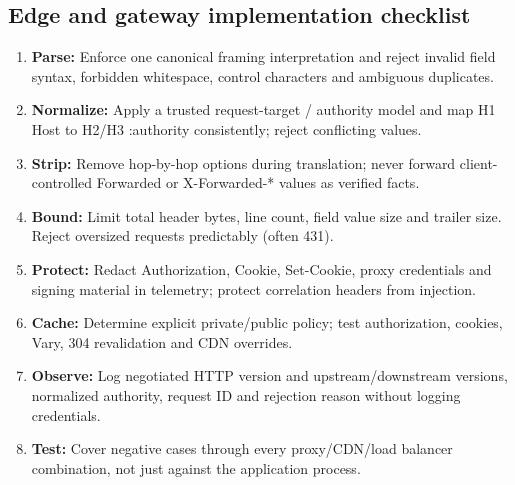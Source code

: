\documentclass[10pt,letterpaper,oneside]{article}
\newcommand{\field}[1]{{\ttfamily\small\color{Deep}#1}}
\begin{document}
\subsection{Edge and gateway implementation checklist}
\begin{enumerate}
\item \textbf{Parse:} Enforce one canonical framing interpretation and reject invalid field syntax, forbidden whitespace, control characters and ambiguous duplicates.
\item \textbf{Normalize:} Apply a trusted request-target / authority model and map H1 \field{Host} to H2/H3 \field{:authority} consistently; reject conflicting values.
\item \textbf{Strip:} Remove hop-by-hop options during translation; never forward client-controlled \field{Forwarded} or \field{X-Forwarded-*} values as verified facts.
\item \textbf{Bound:} Limit total header bytes, line count, field value size and trailer size. Reject oversized requests predictably (often 431).
\item \textbf{Protect:} Redact \field{Authorization}, \field{Cookie}, \field{Set-Cookie}, proxy credentials and signing material in telemetry; protect correlation headers from injection.
\item \textbf{Cache:} Determine explicit private/public policy; test authorization, cookies, \field{Vary}, 304 revalidation and CDN overrides.
\item \textbf{Observe:} Log negotiated HTTP version and upstream/downstream versions, normalized authority, request ID and rejection reason without logging credentials.
\item \textbf{Test:} Cover negative cases through every proxy/CDN/load balancer combination, not just against the application process.
\end{enumerate}
\end{document}
